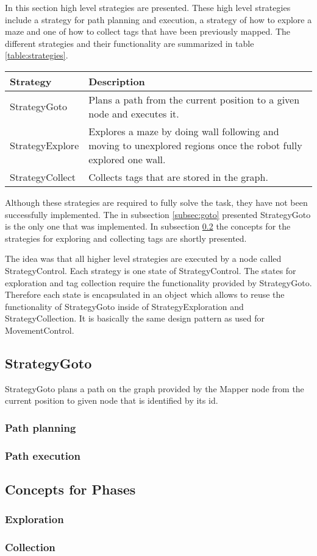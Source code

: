 In this section high level strategies are presented. These high level strategies include a strategy for path planning and execution, a strategy of
how to explore a maze and one of how to collect tags that have been previously mapped. The different strategies and their functionality are summarized in table \ref{table:strategies}.

\begin{table}
\label{table:conditions}
\center
  \begin{tabular}{l|l}
    \textbf{Strategy} & \textbf{Description} \\ \hline
    StrategyGoto & Plans a path from the current position to a given node and executes it.  \\ \hline
    StrategyExplore & Explores a maze by doing wall following and moving to unexplored regions once the robot fully explored one wall. \\ \hline
    StrategyCollect & Collects tags that are stored in the graph. \\
    \hline
  \end{tabular}
\end{table}

Although these strategies are required to fully solve the task, they have not been successfully implemented. The in subsection \ref{subsec:goto} presented StrategyGoto is the only one that was implemented. In subsection \ref{subsec:conceptsStrategies} the concepts for the strategies for exploring and collecting tags are shortly presented.

The idea was that all higher level strategies are executed by a node called StrategyControl. Each strategy is one state of StrategyControl. 
The states for exploration and tag collection require the functionality provided by StrategyGoto. Therefore each state is encapsulated in an object which allows to reuse the functionality of StrategyGoto inside of StrategyExploration and StrategyCollection. It is basically the same design pattern as used for MovementControl.

\subsection{StrategyGoto}
StrategyGoto plans a path on the graph provided by the Mapper node from the current position to given node that is identified by its id.
\subsubsection{Path planning}
\label{pathplanning}

\subsubsection{Path execution}

\subsection{Concepts for Phases}
\label{subsec:conceptsStrategies}
\subsubsection{Exploration}
\subsubsection{Collection}